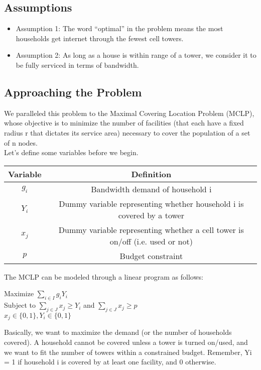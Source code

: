 	\subsection{Assumptions}
	\begin{itemize}
	\item Assumption 1: The word “optimal” in the problem means the most households get internet through the fewest cell towers.
	\item Assumption 2: As long as a house is within range of a tower, we consider it to be fully serviced in terms of bandwidth.
	\end{itemize}

	\subsection{Approaching the Problem}
	We paralleled this problem to the Maximal Covering Location Problem (MCLP), whose objective is to minimize the number of facilities (that each have a fixed radius r that dictates its service area) necessary to cover the population of a set of n nodes.\\
	\indent Let’s define some variables before we begin.
	\begin{center} \begin{tabular} {|c|c|}
		\hline
		Variable & Definition \\
		\hline
		$g_i$ & Bandwidth demand of household i\\
		\hline
		$Y_i$ & Dummy variable representing whether household i is covered by a tower \\
		\hline
		$x_j$ & Dummy variable representing whether a cell tower is on/off (i.e. used or not) \\
		\hline
		$p$ & Budget constraint \\
		\hline
	\end{tabular} \end{center}
	\indent The MCLP can be modeled through a linear program as follows:
	\begin{center}
		Maximize $\sum_{i\in I} g_iY_i$ \\
		Subject to $\sum_{j\in J}x_j \geq Y_i$ and $\sum_{j\in J}x_j \geq p$ \\
		$x_j \in \{0,1\}, Y_i \in \{0,1\}$
	\end{center}
	Basically, we want to maximize the demand (or the number of households covered). A household cannot be covered unless a tower is turned on/used, and we want to fit the number of towers within a constrained budget. Remember, Yi = 1 if household i is covered by at least one facility, and 0 otherwise.

